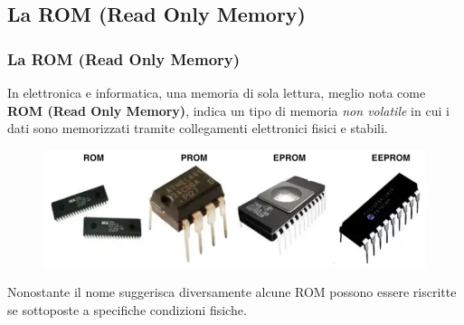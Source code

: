 \subsection[La ROM (Read Only Memory)]{La ROM (Read Only Memory)}
\begin{frame}
	\frametitle{La ROM (Read Only Memory)}
	  
	\begin{block}{}
		In elettronica e informatica, una memoria di sola lettura, meglio nota come \textbf{ROM (Read Only Memory)}, indica un tipo di memoria \textit{non volatile} in cui i dati sono memorizzati tramite collegamenti elettronici fisici e stabili.
		
		\begin{figure}[!htbp] 
			\centering
			\includegraphics[width=0.80\linewidth]{images/5_memory/roms.png}
		\end{figure}
		
		Nonostante il nome suggerisca diversamente alcune ROM possono essere riscritte se sottoposte a specifiche condizioni fisiche.
		
		
	\end{block}
	
\end{frame}


